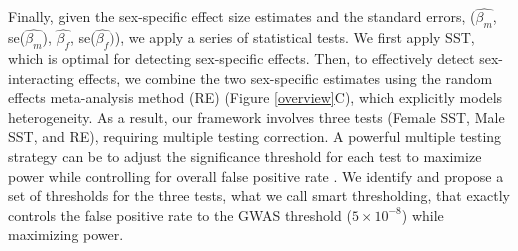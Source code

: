\documentclass[11pt]{article}
\begin{document}
Finally, given the sex-specific effect size estimates and the standard errors,
($\hat{\beta_m}$, se($\hat{\beta_m}$), $\hat{\beta_f}$, se($\hat{\beta_f})$), we apply a series of statistical tests.
We first apply SST, 
which is optimal for detecting sex-specific effects.  
Then, to effectively detect sex-interacting effects, 
we combine the two sex-specific estimates %
using the random effects meta-analysis method (RE) \citep{Han:AmJHumGenet:2011} (Figure \ref{overview}C),
which explicitly models heterogeneity. %
As a result, our framework involves three tests (Female SST, Male SST, and RE),
requiring multiple testing correction. 
A powerful multiple testing strategy can be to adjust the significance threshold for each test 
to maximize power while controlling for overall false positive rate \citep{Eskin:GenomeRes:2008}.
We identify and propose 
a set of thresholds for the three tests, what we call smart thresholding,
that exactly controls the false positive rate to the GWAS threshold ($5\times10^{-8}$) while maximizing power.

\end{document}
